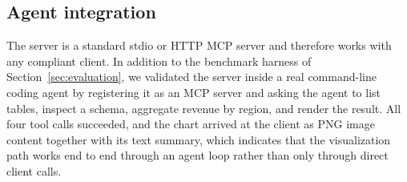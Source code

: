 \subsection{Agent integration}

The server is a standard stdio or HTTP MCP server and therefore works with any compliant client. In addition to the benchmark harness of Section~\ref{sec:evaluation}, we validated the server inside a real command-line coding agent by registering it as an MCP server and asking the agent to list tables, inspect a schema, aggregate revenue by region, and render the result. All four tool calls succeeded, and the chart arrived at the client as PNG image content together with its text summary, which indicates that the visualization path works end to end through an agent loop rather than only through direct client calls.
